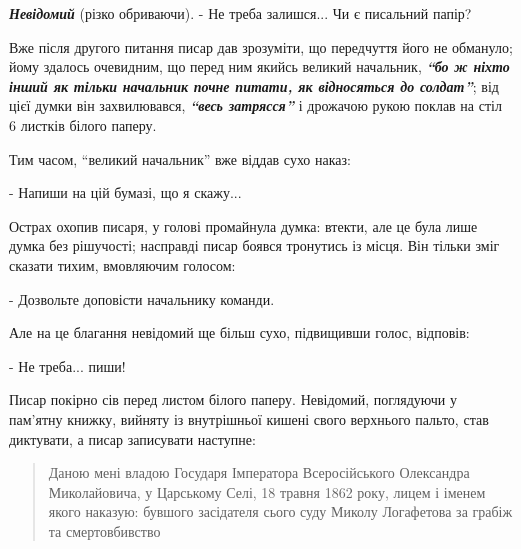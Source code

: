\documentclass[a4paper,20pt]{report}
\begin{document}
\textbf{\em Невідомий} (різко обриваючи). - Не треба залишся... Чи є писальний папір?







Вже після другого питання писар дав зрозуміти, що передчуття його не обмануло;
йому здалось очевидним, що перед ним якийсь великий начальник, \textbf{\em ``бо
ж ніхто інший як тільки начальник почне питати, як відносяться до солдат''}; від цієї
думки він захвилювався, 
\textbf{\em ``весь затрясся''} і дрожачою рукою поклав на стіл 6 листків білого паперу.

Тим часом, ``великий начальник'' вже віддав сухо наказ:

- Напиши на цій бумазі, що я скажу...

Острах охопив писаря, у голові промайнула думка: втекти, але це була лише думка без рішучості;
насправді писар боявся тронутись із місця. Він тільки зміг сказати тихим, вмовляючим голосом:

- Дозвольте доповісти начальнику команди.

Але на це благання невідомий ще більш сухо, підвищивши голос, відповів:

- Не треба... пиши! 

Писар покірно сів перед листом білого паперу. Невідомий, поглядуючи у пам'ятну
книжку, вийняту із внутрішньої кишені свого верхнього пальто, став диктувати, а
писар записувати наступне:

\begin{quote}
\em\bfseries

Даною мені владою Государя Імператора Всеросійського Олександра 
Миколайовича, у Царському Селі, 18 травня 1862 року, лицем і іменем якого наказую:
бувшого засідателя сього суду Миколу Логафетова за грабіж та смертовбивство
\end{quote}

\end{document}
